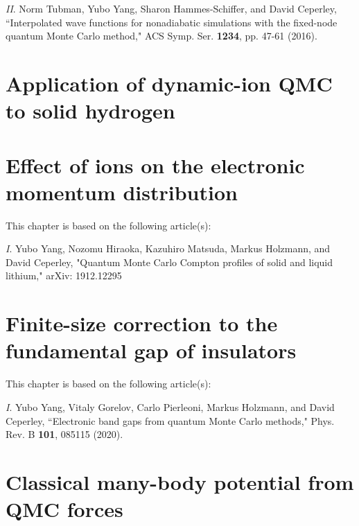 \documentclass[draftthesis,fullpage]{uiucthesis}
\begin{document}
\textit{II}. Norm Tubman, Yubo Yang, Sharon Hammes-Schiffer, and David Ceperley, ``Interpolated wave functions for nonadiabatic simulations with the fixed-node quantum Monte Carlo method," ACS Symp. Ser. \textbf{1234}, pp. 47-61 (2016).




\chapter{Application of dynamic-ion QMC to solid hydrogen}

\chapter{Effect of ions on the electronic momentum distribution}
This chapter is based on the following article(s):

\textit{I}. Yubo Yang, Nozomu Hiraoka, Kazuhiro Matsuda, Markus Holzmann, and David Ceperley, "Quantum Monte Carlo Compton profiles of solid and liquid lithium," arXiv: 1912.12295

%
%

\chapter{Finite-size correction to the fundamental gap of insulators}
This chapter is based on the following article(s):

\textit{I}. Yubo Yang, Vitaly Gorelov, Carlo Pierleoni, Markus Holzmann, and David Ceperley, ``Electronic band gaps from quantum Monte Carlo methods," Phys. Rev. B \textbf{101}, 085115 (2020).



\chapter{Classical many-body potential from QMC forces}
\end{document}
